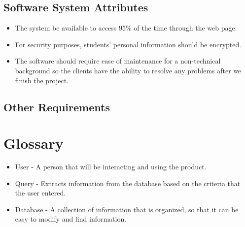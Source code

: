 \documentclass[letterpaper,10pt,titlepage, draftclsnofoot,onecolumn]{IEEEtran}
\begin{document}
\subsection{Software System Attributes}
\begin{itemize}
\item The system be available to access 95\% of the time through the web page.
\item For security purposes, students' personal information should be encrypted.
\item The software should require ease of maintenance for a non-technical background so the clients have the ability to resolve any problems after we finish the project.
\end{itemize}

\subsection{Other Requirements}

\section{Glossary}
\begin{itemize}
\item User - A person that will be interacting and using the product.
\item Query - Extracts information from the database based on the criteria that the user entered.
\item Database - A collection of information that is organized, so that it can be easy to modify and find information. 
\end{itemize}
\end{document}
